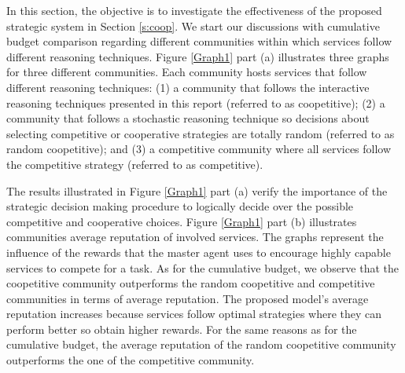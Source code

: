 In this section, the objective is to investigate the effectiveness of the proposed strategic system in Section \ref{s:coop}.
We start our discussions with cumulative budget comparison
regarding different communities within which services follow
different reasoning techniques. Figure \ref{Graph1} part (a)
illustrates three graphs for three different communities. Each
community hosts services that follow different reasoning
techniques: (1) a community that follows the interactive reasoning
techniques presented in this report (referred to as coopetitive);
(2) a community that follows a stochastic reasoning technique so
decisions about selecting competitive or cooperative strategies
are totally random (referred to as random coopetitive); and (3) a
competitive community where all services follow the competitive
strategy (referred to as competitive).


The results illustrated in Figure \ref{Graph1} part (a)  verify
the importance of the strategic decision making procedure to
logically decide over the possible competitive and cooperative
choices. Figure \ref{Graph1} part (b) illustrates communities
average reputation of involved services. The graphs represent the
influence of the rewards that the master agent uses to encourage
highly capable services to compete for a task. As for the
cumulative budget, we observe that the coopetitive community
outperforms the random coopetitive and competitive communities in
terms of average reputation. The proposed model's average
reputation increases because services follow optimal strategies
where they can perform better so obtain higher rewards. For the
same reasons as for the cumulative budget, the average reputation
of the random coopetitive community
outperforms the one of the competitive community. %


